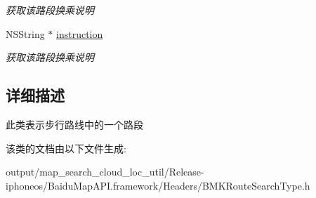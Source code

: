 \begin{DoxyCompactItemize}
\begin{DoxyCompactList}\small\item\em 获取该路段换乘说明 \end{DoxyCompactList}\item 
\hypertarget{interface_b_m_k_walking_step_ac55da8a1ca91a2b9d3bce4ddb711cf8e}{}N\+S\+String $\ast$ \hyperlink{interface_b_m_k_walking_step_ac55da8a1ca91a2b9d3bce4ddb711cf8e}{instruction}\label{interface_b_m_k_walking_step_ac55da8a1ca91a2b9d3bce4ddb711cf8e}

\begin{DoxyCompactList}\small\item\em 获取该路段换乘说明 \end{DoxyCompactList}\end{DoxyCompactItemize}


\subsection{详细描述}
此类表示步行路线中的一个路段 

该类的文档由以下文件生成\+:\begin{DoxyCompactItemize}
\item 
output/map\+\_\+search\+\_\+cloud\+\_\+loc\+\_\+util/\+Release-\/iphoneos/\+Baidu\+Map\+A\+P\+I.\+framework/\+Headers/B\+M\+K\+Route\+Search\+Type.\+h\end{DoxyCompactItemize}
